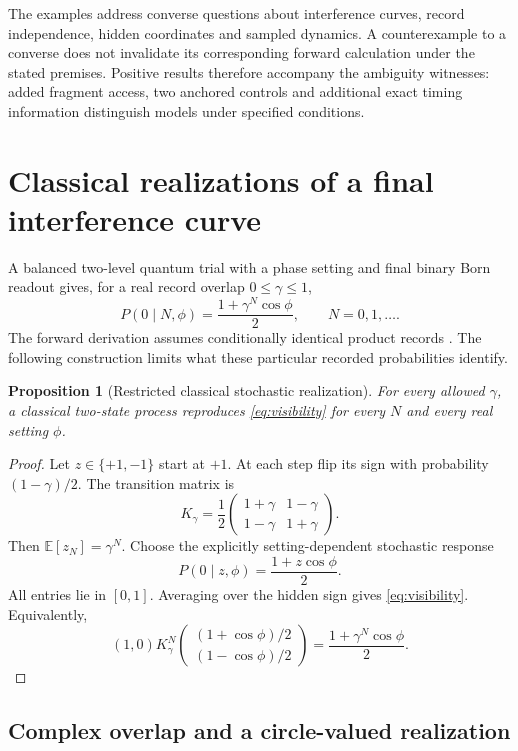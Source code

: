 \documentclass[11pt,letterpaper]{article}
\newtheorem{proposition}[theorem]{Proposition}
\begin{document}
The examples address converse questions about interference curves, record
independence, hidden coordinates and sampled dynamics. A counterexample to a
converse does not invalidate its corresponding forward calculation under the
stated premises. Positive results therefore accompany the ambiguity witnesses:
added fragment access, two anchored controls and additional exact timing
information distinguish models under specified conditions.


\section{Classical realizations of a final interference curve}

A balanced two-level quantum trial with a phase setting and final binary Born readout gives, for a real record overlap $0\le\gamma\le1$,
\begin{equation}
 P(0\mid N,\phi)=\frac{1+\gamma^N\cos\phi}{2},\qquad
 N=0,1,\ldots . \label{eq:visibility}
\end{equation}
The forward derivation assumes conditionally identical product records \cite{internalcandidate}. The following construction limits what these particular recorded probabilities identify.

\begin{proposition}[Restricted classical stochastic realization]
For every allowed $\gamma$, a classical two-state process reproduces \eqref{eq:visibility} for every $N$ and every real setting $\phi$.
\end{proposition}
\begin{proof}
Let $z\in\{+1,-1\}$ start at $+1$. At each step flip its sign with probability $(1-\gamma)/2$. The transition matrix is
\[
 K_\gamma=\frac12\begin{pmatrix}1+\gamma&1-\gamma\\1-\gamma&1+\gamma\end{pmatrix}.
\]
Then $\mathbb E[z_N]=\gamma^N$. Choose the explicitly setting-dependent stochastic response
\[
 P(0\mid z,\phi)=\frac{1+z\cos\phi}{2}.
\]
All entries lie in $[0,1]$. Averaging over the hidden sign gives \eqref{eq:visibility}. Equivalently,
\[
 (1,0)K_\gamma^N
 \begin{pmatrix}(1+\cos\phi)/2\\(1-\cos\phi)/2\end{pmatrix}
 =\frac{1+\gamma^N\cos\phi}{2}.
\]
\end{proof}


\subsection{Complex overlap and a circle-valued realization}
\end{document}
